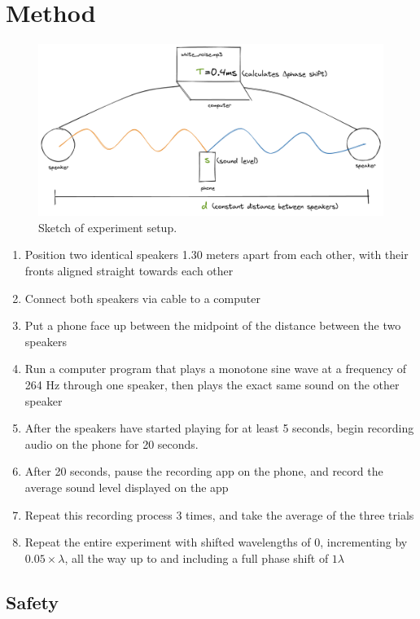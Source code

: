 \documentclass[index]{subfiles}
\begin{document}
\section{Method}

\begin{figure}[H]
    \centering
    \includegraphics[scale=0.24]{sound_diagram.png}
    \caption{Sketch of experiment setup.}
\end{figure}

\begin{enumerate}
    \item Position two identical speakers 1.30 meters apart from each other, with their fronts aligned straight towards each other
    \item Connect both speakers via cable to a computer
    \item Put a phone face up between the midpoint of the distance between the two speakers
    \item Run a computer program that plays a monotone sine wave at a frequency of 264 Hz through one speaker, then plays the exact same sound on the other speaker
    \item After the speakers have started playing for at least 5 seconds, begin recording audio on the phone for 20 seconds.
    \item After 20 seconds, pause the recording app on the phone, and record the average sound level displayed on the app
    \item Repeat this recording process 3 times, and take the average of the three trials
    \item Repeat the entire experiment with shifted wavelengths of 0, incrementing by \(0.05\times\lambda\), all the way up to and including a full phase shift of \(1\lambda\)
\end{enumerate}

\subsection{Safety}
\end{document}
